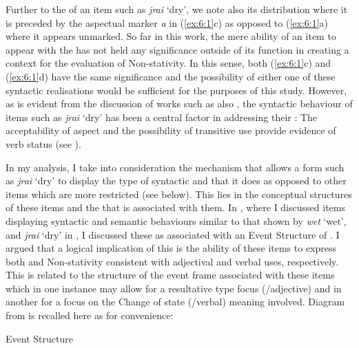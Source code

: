 Further to the  of an item such as \textit{jrai} `dry', we note also its distribution where it is preceded by the aspectual marker \textit{a} in (\ref{ex:6:1}c) as opposed to (\ref{ex:6:1}a) where it appears unmarked. So far in this work, the mere ability of an item to appear with the   has not held any significance outside of its function in creating a context for the evaluation of Non-stativity. In this sense, both (\ref{ex:6:1}c) and (\ref{ex:6:1}d) have the same significance and the possibility of either one of these syntactic realisations would be sufficient for the purposes of this study. However, as is evident from the discussion of works such as \citet{Winford1993,Sebba1986,Seuren1986} also \citet{Kouwenberg1996}, the syntactic behaviour of items such as \textit{jrai}  `dry’ has been a central factor in addressing their : The acceptability of  aspect and the possibility of transitive use provide evidence of verb status (see ). 

In my analysis, I take into consideration the mechanism that allows a form such as \textit{jrai} `dry' to display the type of syntactic and  that it does as opposed to other items which are more restricted (see  below). This lies in the conceptual structures of these items and the  that is associated with them. In , where I discussed items displaying syntactic and semantic behaviours similar to that shown by \textit{wet} `wet', and \textit{jrai} `dry' in , I discussed these as associated with an Event Structure of . I argued that a logical implication of this is the ability of these items to express both  and Non-stativity consistent with adjectival and verbal uses, respectively. This is related to the structure of the event frame associated with these items which in one instance may allow for a resultative type focus (\slash adjective) and in another for a focus on the Change of state (\slash verbal) meaning involved. Diagram  from  is recalled here as  for convenience: 

\ea%
 \label{ex:6:2} 
  Event Structure \citep[56]{Pustejovsky1991}
\begin{center}\end{center}
\z

